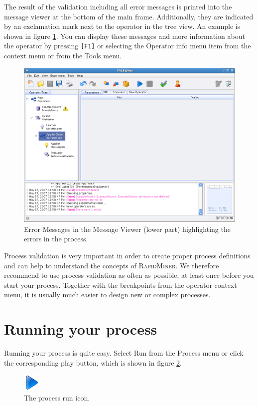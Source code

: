 \documentclass[11pt]{article}
\newcommand{\key}[1]{\texttt{[#1]}}
\newcommand{\useroption}[1]{\textsf{#1}}
\newcommand{\rapidminer}{\protect \textsc{RapidMiner}\xspace}
\begin{document}
The result of the validation including all error messages is printed into the 
message viewer at the bottom of the main frame.
Additionally, they are indicated by an
exclamation mark next to the operator in the tree view. An example is
shown in figure \ref{fig:error_message}. You can display these
messages and more information about the operator by 
pressing \key{F1} or selecting the \useroption{Operator info} menu item
from the context menu or from the \useroption{Tools} menu.
\begin{figure}[ht]
\center
\includegraphics[width=0.88\linewidth]{error_message.png}
\caption{Error Messages in the Message Viewer (lower part)
  highlighting the errors in the process.}
\label{fig:error_message}
\end{figure}


Process validation is very important in order to create proper process definitions
and can help to understand the concepts of \rapidminer. We therefore recommend to use
process validation as often as possible, at least once before you start
your process. Together with the breakpoints from the operator context menu,
it is usually much easier to design new or complex processes.



\section{Running your process}

Running your process is quite easy. Select \useroption{Run}
from the \useroption{Process} menu or click the corresponding
play button, which is shown in figure \ref{fig:play_button}.
\begin{figure}[ht]
\center
\includegraphics[width=0.08\linewidth]{play_button.png}
\caption{The process run icon.}
\label{fig:play_button}
\end{figure}
\end{document}
